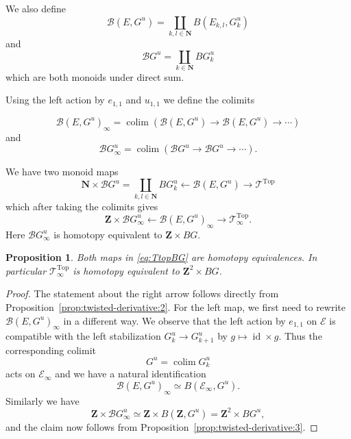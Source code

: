 \documentclass[reqno]{amsart}
\theoremstyle{theorem}
\newtheorem{proposition}[corollary]{Proposition}
\theoremstyle{remark}
\theoremstyle{definition}
\DeclareMathOperator*{\colim}{colim}
\newcommand{\T}{\mathcal{T}}
\newcommand{\E}{\mathcal{E}}
\newcommand{\B}{\mathcal{B}}
\newcommand{\Z}{\mathbf{Z}}
\newcommand{\N}{\mathbf{N}}
\newcommand{\TOP}{\mathrm{Top}}
\DeclareMathOperator{\id}{id}
\begin{document}
We also define
\[\B(E,G^u)=\coprod_{k,l\in \N} B(E_{k,l},G_k^u)\]
and
\[\B G^u=\coprod_{k\in \N} B G^u_k\]
which are both monoids under direct sum. 


Using the left action by $e_{1,1}$ and $u_{1,1}$ we define the colimits


\[\B(E,G^u)_\infty=\colim(\B(E,G^u)\to \B(E,G^u) \to \cdots)\]
and
\[\B G^u_\infty=\colim(\B G^u\to \B G^u\to \cdots).\]


We have two monoid maps
\[\N\times \B G^u=\coprod_{k,l\in \N} B G^u_k \leftarrow \B(E, G^u) \to \T^\TOP\]
which after taking the colimits gives
\begin{equation}\label{eq:TtopBG}
\Z\times \B G^u_\infty \leftarrow \B(E, G^u)_\infty \to \T_\infty^\TOP.
\end{equation}
Here $\B G^u_\infty$ is homotopy equivalent to $\Z\times BG$.


\begin{proposition}\label{prop:BGu}
Both maps in \eqref{eq:TtopBG} are homotopy equivalences. In particular $\T_\infty^\TOP$ is homotopy equivalent to $\Z^2\times BG$.
\end{proposition}


\begin{proof}
The statement about the right arrow follows directly from Proposition~\ref{prop:twisted-derivative:2}. For the left map, we first need to rewrite $\B(E,G^u)_\infty$ in a different way.
We observe that the left action by $e_{1,1}$ on $\E$ is compatible with the left stabilization
$G^u_k\to G^u_{k+1}$ by $g\mapsto \id\times g$. Thus the corresponding colimit
\[ G^u =\colim G^u_k\]
acts on $\E_\infty$ and we have a natural identification
\[\B(E,G^u)_\infty\simeq B(\E_\infty,G^u).\]
Similarly we have
\[\Z\times \B G^u_\infty\simeq \Z\times B(\Z, G^u)=\Z^2\times BG^u,\]
and the claim now follows from Proposition~\ref{prop:twisted-derivative:3}.
\end{proof}
\end{document}
